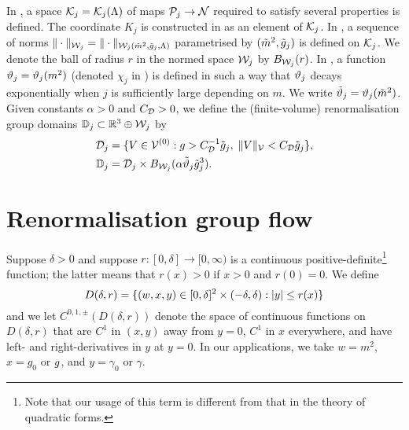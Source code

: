 In \cite[Definition~\ref{step-def:Kspace}]{BS-rg-step},
a space $\mathcal{K}_j = \mathcal{K}_j(\Lambda)$ of maps $\mathcal{P}_j \rightarrow \mathcal{N}$ required to satisfy
several properties is defined.
The coordinate $K_j$ is constructed in \cite{BS-rg-step} as an element of $\mathcal{K}_j$.
In \cite[Section~\ref{step-sec:Knorms}]{BS-rg-step},
a sequence of norms $\|\cdot\|_{\mathcal{W}_j} = \|\cdot\|_{\mathcal{W}_j(\tilde{m}^2, \tilde{g}_j, \Lambda)}$
parametrised by $(\tilde{m}^2, \tilde{g}_j)$ is defined on $\mathcal{K}_j$.
We denote the ball of radius $r$ in
the normed space $\mathcal{W}_j$ by $B_{\mathcal{W}_j}(r)$.
In \cite[\eqref{log-e:mass-scale}--\eqref{log-e:chidef}]{BBS-saw4-log},
a function $\vartheta_j = \vartheta_j(m^2)$ (denoted $\chi_j$ in \cite{BBS-saw4-log})
is defined in such a way that $\vartheta_j$ decays exponentially
when $j$ is sufficiently large depending on $m$.
We write $\tilde{\vartheta}_j = \vartheta_j(\tilde{m}^2)$.
Given constants $\alpha > 0$ and $C_{\mathcal{D}} > 0$,
we define the (finite-volume)
renormalisation group domains $\mathbb{D}_j \subset {\mathbb R}^3 \oplus \mathcal{W}_j$ by
\begin{align}
\label{e:DVdef}
	\mathcal{D}_j &= \{V\in \mathcal{V}^{(0)} :
	g> C_{\mathcal{D}}^{-1} \tilde{g}_j  , \;  \|V\|_{\mathcal{V}} < C_{\mathcal{D}} \tilde{g}_j \},
\\
\mathbb{D}_j &= \mathcal{D}_j \times B_{\mathcal{W}_j}(\alpha \tilde{\vartheta}_j \tilde{g}_j^3).
\end{align}


\section{Renormalisation group flow}

Suppose $\delta > 0$ and suppose $r : [0, \delta] \to [0, \infty)$
is a continuous positive-definite\footnote{Note that our usage of this term is
different from that in the theory of quadratic forms.} function; the latter
means that $r(x) > 0$ if $x > 0$ and $r(0) = 0$.
We define
\begin{equation}
\lbeq{Ddef}
D(\delta, r)
	=
\{ (w, x, y) \in [0, \delta]^2 \times (-\delta, \delta) : |y| \leq r(x) \}
\end{equation}
and we let $C^{0,1,\pm}(D(\delta, r))$ denote the space of continuous functions on $D(\delta, r)$
that are $C^1$ in $(x, y)$ away from $y = 0$, $C^1$ in $x$ everywhere,
and have left- and right-derivatives in $y$ at $y = 0$.
In our applications, we take $w = m^2$, $x = g_0$ or $g$,
and $y = \gamma_0$ or $\gamma$.

